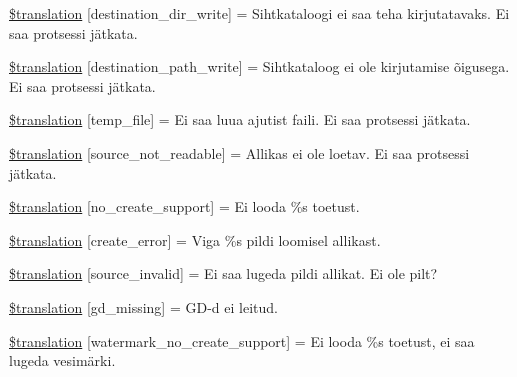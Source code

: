 \begin{DoxyCompactItemize}
\item 
\hyperlink{class_8upload_8et___e_e_8php_a97608ea194a616db49141a0e6dee900c}{\$translation} \mbox{[}\textquotesingle{}destination\+\_\+dir\+\_\+write\textquotesingle{}\mbox{]} = \textquotesingle{}Sihtkataloogi ei saa teha kirjutatavaks. Ei saa protsessi jätkata.\textquotesingle{}
\item 
\hyperlink{class_8upload_8et___e_e_8php_a40e4e1962226b89fd76da5819a9602b0}{\$translation} \mbox{[}\textquotesingle{}destination\+\_\+path\+\_\+write\textquotesingle{}\mbox{]} = \textquotesingle{}Sihtkataloog ei ole kirjutamise õigusega. Ei saa protsessi jätkata.\textquotesingle{}
\item 
\hyperlink{class_8upload_8et___e_e_8php_a2baece8da11e20d45175db91851ec3e3}{\$translation} \mbox{[}\textquotesingle{}temp\+\_\+file\textquotesingle{}\mbox{]} = \textquotesingle{}Ei saa luua ajutist faili. Ei saa protsessi jätkata.\textquotesingle{}
\item 
\hyperlink{class_8upload_8et___e_e_8php_a922967ca2df0efdd455261142d8e5715}{\$translation} \mbox{[}\textquotesingle{}source\+\_\+not\+\_\+readable\textquotesingle{}\mbox{]} = \textquotesingle{}Allikas ei ole loetav. Ei saa protsessi jätkata.\textquotesingle{}
\item 
\hyperlink{class_8upload_8et___e_e_8php_a346dfd1ade29f583dd20d345c436859f}{\$translation} \mbox{[}\textquotesingle{}no\+\_\+create\+\_\+support\textquotesingle{}\mbox{]} = \textquotesingle{}Ei looda \%s toetust.\textquotesingle{}
\item 
\hyperlink{class_8upload_8et___e_e_8php_a53013ce9255c4e1849098ddd9fdb2b3f}{\$translation} \mbox{[}\textquotesingle{}create\+\_\+error\textquotesingle{}\mbox{]} = \textquotesingle{}Viga \%s pildi loomisel allikast.\textquotesingle{}
\item 
\hyperlink{class_8upload_8et___e_e_8php_a6ab0a660b457eaf2d3434b225449fdd6}{\$translation} \mbox{[}\textquotesingle{}source\+\_\+invalid\textquotesingle{}\mbox{]} = \textquotesingle{}Ei saa lugeda pildi allikat. Ei ole pilt?\textquotesingle{}
\item 
\hyperlink{class_8upload_8et___e_e_8php_a7f3dfcc0db4bbc0f2e7210c439798e56}{\$translation} \mbox{[}\textquotesingle{}gd\+\_\+missing\textquotesingle{}\mbox{]} = \textquotesingle{}G\+D-\/d ei leitud.\textquotesingle{}
\item 
\hyperlink{class_8upload_8et___e_e_8php_a82d5853430ab72dc1f9799ec36144cc6}{\$translation} \mbox{[}\textquotesingle{}watermark\+\_\+no\+\_\+create\+\_\+support\textquotesingle{}\mbox{]} = \textquotesingle{}Ei looda \%s toetust, ei saa lugeda vesimärki.\textquotesingle{}

\end{DoxyCompactItemize}
